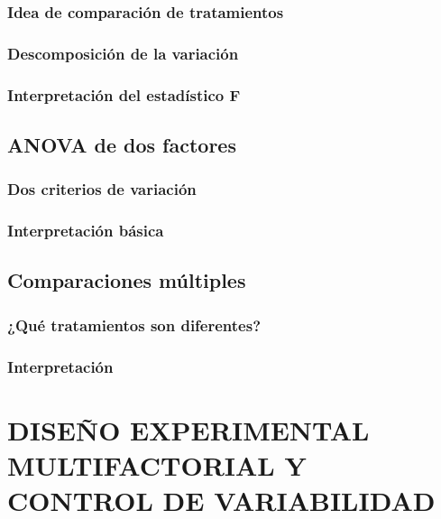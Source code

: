 \documentclass[
  oneside]{book}
\begin{document}
\subsubsection{Idea de comparación de tratamientos}\label{idea-de-comparaciuxf3n-de-tratamientos}

\subsubsection{Descomposición de la variación}\label{descomposiciuxf3n-de-la-variaciuxf3n}

\subsubsection{Interpretación del estadístico F}\label{interpretaciuxf3n-del-estaduxedstico-f}

\subsection{ANOVA de dos factores}\label{anova-de-dos-factores}

\subsubsection{Dos criterios de variación}\label{dos-criterios-de-variaciuxf3n}

\subsubsection{Interpretación básica}\label{interpretaciuxf3n-buxe1sica}

\subsection{Comparaciones múltiples}\label{comparaciones-muxfaltiples}

\subsubsection{¿Qué tratamientos son diferentes?}\label{quuxe9-tratamientos-son-diferentes}

\subsubsection{Interpretación}\label{interpretaciuxf3n}

\section{DISEÑO EXPERIMENTAL MULTIFACTORIAL Y CONTROL DE VARIABILIDAD}\label{diseuxf1o-experimental-multifactorial-y-control-de-variabilidad}
\end{document}

